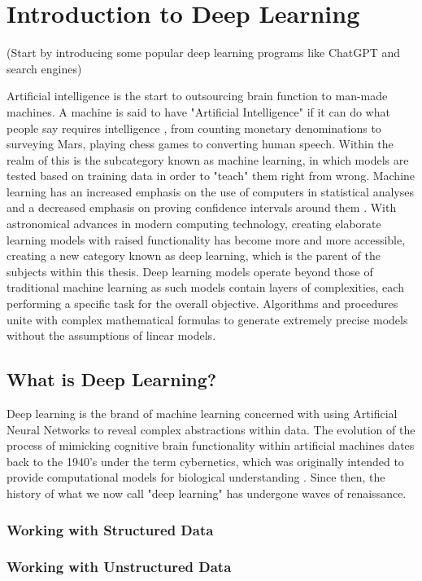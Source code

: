 \chapter{Introduction to Deep Learning}

(Start by introducing some popular deep learning programs like ChatGPT and search engines)

Artificial intelligence is the start to outsourcing brain function to man-made machines.  A machine is said to have "Artificial Intelligence" if it can do what people say requires intelligence \cite{jackson2019introduction}, from counting monetary denominations to surveying Mars, playing chess games to converting human speech.  Within the realm of this is the subcategory known as machine learning, in which models are tested based on training data in order to "teach" them right from wrong.  Machine learning has an increased emphasis on the use of computers in statistical analyses and a decreased emphasis on proving confidence intervals around them \cite{Goodfellow-et-al-2016}.  With astronomical advances in modern computing technology, creating elaborate learning models with raised functionality has become more and more accessible, creating a new category known as deep learning, which is the parent of the subjects within this thesis.  Deep learning models operate beyond those of traditional machine learning as such models contain layers of complexities, each performing a specific task for the overall objective.  Algorithms and procedures unite with complex mathematical formulas to generate extremely precise models without the assumptions of linear models.



\section{What is Deep Learning?} %

Deep learning is the brand of machine learning concerned with using Artificial Neural Networks to reveal complex abstractions within data.
The evolution of the process of mimicking cognitive brain functionality within artificial machines dates back to the 1940's under the term cybernetics, which was originally intended to provide computational models for biological understanding \cite{Goodfellow-et-al-2016}.  Since then, the history of what we now call "deep learning" has undergone waves of renaissance.

\subsection{Working with Structured Data} %

\subsection{Working with Unstructured Data} %
